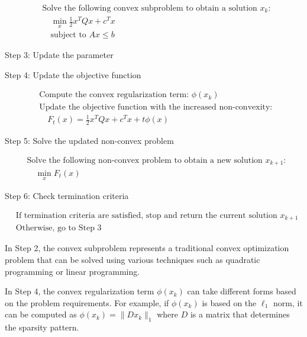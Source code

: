 \begin{align*}
&\text{Solve the following convex subproblem to obtain a solution } x_k: \\
&\quad \min_{x} \frac{1}{2}x^TQx + c^Tx \\
&\quad \text{subject to } Ax \leq b
\end{align*}

Step 3: Update the parameter 

Step 4: Update the objective function

\begin{align*}
&\text{Compute the convex regularization term: } \phi(x_k) \\
&\text{Update the objective function with the increased non-convexity: } \\
&\quad F_t(x) = \frac{1}{2}x^TQx + c^Tx + t\phi(x)
\end{align*}

Step 5: Solve the updated non-convex problem

\begin{align*}
&\text{Solve the following non-convex problem to obtain a new solution } x_{k+1}: \\
&\quad \min_{x} F_t(x)
\end{align*}

Step 6: Check termination criteria

\begin{align*}
&\text{If termination criteria are satisfied, stop and return the current solution } x_{k+1} \\
&\text{Otherwise, go to Step 3}
\end{align*}

In Step 2, the convex subproblem represents a traditional convex optimization problem that can be solved using various techniques such as quadratic programming or linear programming.

In Step 4, the convex regularization term $\phi(x_k)$ can take different forms based on the problem requirements. For example, if $\phi(x_k)$ is based on the $\ell_1$ norm, it can be computed as $\phi(x_k) = \|Dx_k\|_1$ where $D$ is a matrix that determines the sparsity pattern.


